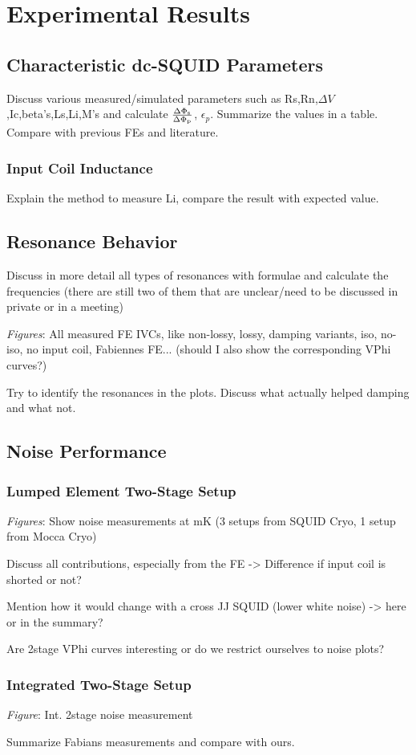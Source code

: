 \chapter{Experimental Results} \label{ch_results}

\section{Characteristic dc-SQUID Parameters}

Discuss various measured/simulated parameters such as Rs,Rn,$\Delta V$,Ic,beta's,Ls,Li,M's and calculate $\frac{\Delta\Phi_{\rm s}}{\Delta\Phi_{\rm p}}$, $\epsilon_p$. Summarize the values in a table. Compare with previous FEs and literature. 

\subsection{Input Coil Inductance}

Explain the method to measure Li, compare the result with expected value.

\section{Resonance Behavior}\label{sec_resonance_results}

Discuss in more detail all types of resonances with formulae and calculate the frequencies (there are still two of them that are unclear/need to be discussed in private or in a meeting)

\textit{Figures}: All measured FE IVCs, like non-lossy, lossy, damping variants, iso, no-iso, no input coil, Fabiennes FE... (should I also show the corresponding VPhi curves?)

Try to identify the resonances in the plots. Discuss what actually helped damping and what not. 

\section{Noise Performance}

\subsection{Lumped Element Two-Stage Setup}

\textit{Figures}: Show noise measurements at mK (3 setups from SQUID Cryo, 1 setup from Mocca Cryo) 

Discuss all contributions, especially from the FE -> Difference if input coil is shorted or not?

Mention how it would change with a cross JJ SQUID (lower white noise) -> here or in the summary?

Are 2stage VPhi curves interesting or do we restrict ourselves to noise plots?

\subsection{Integrated Two-Stage Setup}

\textit{Figure}: Int. 2stage noise measurement

Summarize Fabians measurements and compare with ours. 